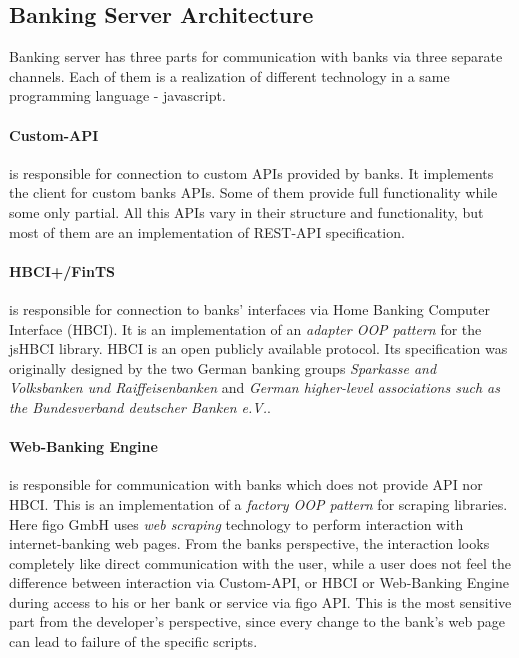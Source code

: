 \subsection{Banking Server Architecture}
\label{sec:bankingArch}
	Banking server has three parts for communication with banks via three separate channels. Each of them is a realization of different technology in a same programming language - javascript.  

	\paragraph{Custom-API} is responsible for connection to custom APIs provided by banks. It implements the client for custom banks APIs. Some of them provide full functionality while some only partial. All this APIs vary in their structure and functionality, but most of them  are an implementation of REST-API specification.
	
	\paragraph{HBCI+/FinTS} is responsible for connection to banks' interfaces via Home Banking Computer Interface (HBCI). It is an implementation of an \textit{adapter OOP pattern} for the jsHBCI library.  HBCI is an open publicly available protocol. Its specification was originally designed by the two German banking groups \textit{Sparkasse and Volksbanken und Raiffeisenbanken} and \textit{German higher-level associations such as the Bundesverband deutscher Banken e.V.}.  \cite{finTS}
	
	\paragraph{Web-Banking Engine} is responsible for communication with banks which does not provide API nor HBCI. This is an implementation of a \textit{factory OOP pattern} for scraping libraries. Here figo GmbH uses \textit{web scraping} technology to perform interaction with internet-banking web pages.
	From the banks perspective, the interaction looks completely like direct communication with the user, while a user does not feel the difference between interaction via Custom-API, or HBCI or Web-Banking Engine during access to his or her bank or service via figo API.
	This is the most sensitive part from the developer's perspective, since every change to the bank's web page can lead to failure of the specific scripts. \\
	
